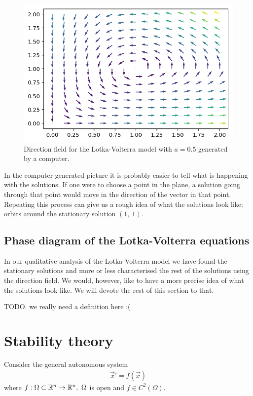\begin{figure}
  [h]
  \centering
  \includegraphics[width=0.8\columnwidth]{figures/lotka-volterra-direction-field.png}

  \caption{Direction field for the Lotka-Volterra model with $a = 0.5$ generated by a computer.}
\end{figure}

In the computer generated picture it is probably easier to tell what is
happening with the solutions. If one were to choose a point in the plane, a
solution going through that point would move in the direction of the vector in
that point. Repeating this process can give us a rough idea of what the
solutions look like: orbits around the stationary solution $(1,\ 1)$.


\subsection{Phase diagram of the Lotka-Volterra equations}

In our qualitative analysis of the Lotka-Volterra model we have found the
stationary solutions and more or less characterised the rest of the solutions
using the direction field. We would, however, like to have a more precise idea
of what the solutions look like. We will devote the rest of this section to
that.

\begin{dfn}

  TODO. we really need a definition here :(
\end{dfn}


\section{Stability theory}

Consider the general autonomous system
\begin{align}
  \label{eq:autonomous-stability}
  \vec{x}' = f(\vec{x})
\end{align}
where $f: \Omega \subset \mathbb{R}^n \to \mathbb{R}^n,\ \Omega$ is open and $f \in
C^2(\Omega)$.

